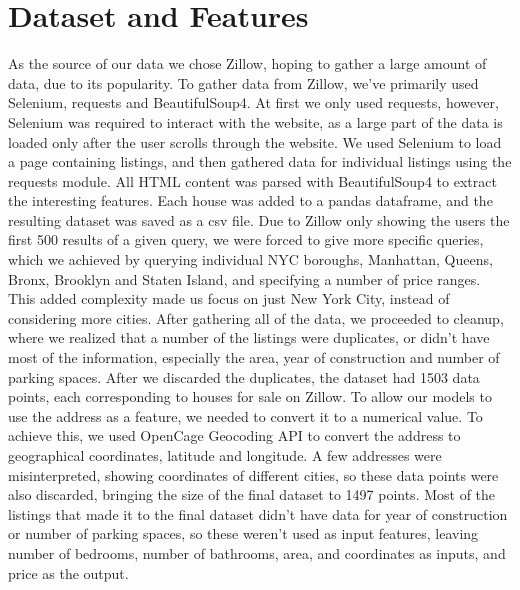 \documentclass[12pt, a4paper, twoside]{article}%
\begin{document}
\section{Dataset and Features}
As the source of our data we chose Zillow, hoping to gather a large amount of data, due to its popularity.
To gather data from Zillow, we’ve primarily used Selenium, requests and BeautifulSoup4. At first we only used requests, however, Selenium was required to interact with the website, as a large part of the data is loaded only after the user scrolls through the website. We used Selenium to load a page containing listings, and then gathered data for individual listings using the requests module. All HTML content was parsed with BeautifulSoup4 to extract the interesting features. Each house was added to a pandas dataframe, and the resulting dataset was saved as a csv file.
Due to Zillow only showing the users the first 500 results of a given query, we were forced to give more specific queries, which we achieved by querying individual NYC boroughs, Manhattan, Queens, Bronx, Brooklyn and Staten Island, and specifying a number of price ranges. This added complexity made us focus on just New York City, instead of considering more cities.
After gathering all of the data, we proceeded to cleanup, where we realized that a number of the listings were duplicates, or didn’t have most of the information, especially the area, year of construction and number of parking spaces. After we discarded the duplicates, the dataset had 1503 data points, each corresponding to houses for sale on Zillow.
To allow our models to use the address as a feature, we needed to convert it to a numerical value. To achieve this, we used OpenCage Geocoding API to convert the address to geographical coordinates, latitude and longitude. A few addresses were misinterpreted, showing coordinates of different cities, so these data points were also discarded, bringing the size of the final dataset to 1497 points. Most of the listings that made it to the final dataset didn’t have data for year of construction or number of parking spaces, so these weren’t used as input features, leaving number of bedrooms, number of bathrooms, area, and coordinates as inputs, and price as the output.
\end{document}
